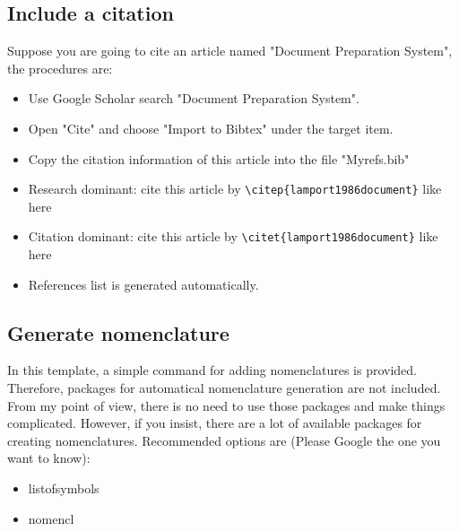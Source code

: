 \subsection{Include a citation}
Suppose you are going to cite an article named "Document Preparation System", the procedures are:
\begin{itemize}
    \item Use Google Scholar search "Document Preparation System".
    \item Open "Cite" and choose "Import to Bibtex" under the target item.
    \item Copy the citation information of this article into the file "Myrefs.bib"
    \item Research dominant: cite this article by \verb+\citep{lamport1986document}+ like here \citep{lamport1986document}
    \item Citation dominant: cite this article by \verb+\citet{lamport1986document}+ like here \citet{lamport1986document}
    \item References list is generated automatically.
\end{itemize}

\subsection{Generate nomenclature}
In this template, a simple command for adding nomenclatures is provided. Therefore, packages for automatical nomenclature generation are not included. From my point of view, there is no need to use those packages and make things complicated. However, if you insist, there are a lot of available packages for creating nomenclatures. Recommended options are (Please Google the one you want to know):
\begin{itemize}
    \item listofsymbols
    \item nomencl
\end{itemize}

